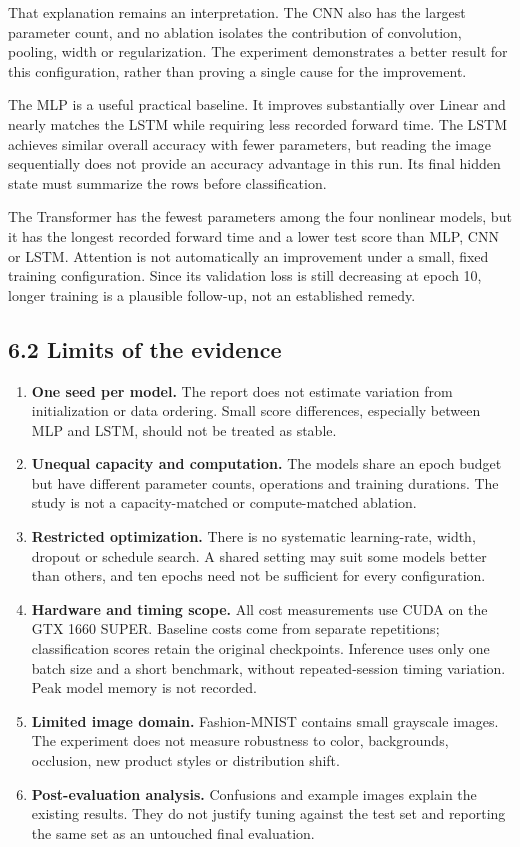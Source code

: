 That explanation remains an interpretation. The CNN also has the largest
parameter count, and no ablation isolates the contribution of convolution,
pooling, width or regularization. The experiment demonstrates a better result
for this configuration, rather than proving a single cause for the improvement.

The MLP is a useful practical baseline. It improves substantially over Linear
and nearly matches the LSTM while requiring less recorded forward time.
The LSTM achieves similar overall accuracy with fewer parameters, but reading
the image sequentially does not provide an accuracy advantage in this run.
Its final hidden state must summarize the rows before classification.

The Transformer has the fewest parameters among the four nonlinear models,
but it has the longest recorded forward time and a lower test score than MLP,
CNN or LSTM. Attention is not automatically an improvement under a small,
fixed training configuration. Since its validation loss is still decreasing
at epoch 10, longer training is a plausible follow-up, not an established remedy.

\subsection{6.2 Limits of the evidence}
\begin{enumerate}
\item \textbf{One seed per model.} The report does not estimate variation from
initialization or data ordering. Small score differences, especially between
MLP and LSTM, should not be treated as stable.
\item \textbf{Unequal capacity and computation.} The models share an epoch budget
but have different parameter counts, operations and training durations.
The study is not a capacity-matched or compute-matched ablation.
\item \textbf{Restricted optimization.} There is no systematic learning-rate,
width, dropout or schedule search. A shared setting may suit some models better
than others, and ten epochs need not be sufficient for every configuration.
\item \textbf{Hardware and timing scope.} All cost measurements use CUDA on
the GTX 1660 SUPER. Baseline costs come from separate repetitions; classification
scores retain the original checkpoints. Inference uses only one batch size and a short benchmark,
without repeated-session timing variation. Peak model memory is not recorded.
\item \textbf{Limited image domain.} Fashion-MNIST contains small grayscale
images. The experiment does not measure robustness to color, backgrounds,
occlusion, new product styles or distribution shift.
\item \textbf{Post-evaluation analysis.} Confusions and example images explain
the existing results. They do not justify tuning against the test set and
reporting the same set as an untouched final evaluation.
\end{enumerate}

